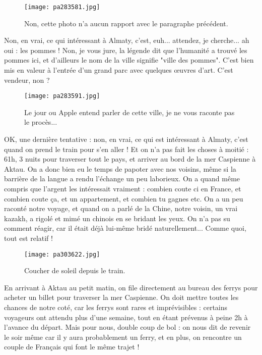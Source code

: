 \documentclass{book}
\begin{document}
\begin{figure}[h]
\centering
\texttt{[image: pa283581.jpg]}
\caption*{Non, cette photo n'a aucun rapport avec le paragraphe précédent.}
\end{figure}

Non, en vrai, ce qui intéressant à Almaty, c'est, euh... attendez, je cherche... ah oui : les pommes ! Non, je vous jure, la légende dit que l'humanité a trouvé les pommes ici, et d'ailleurs le nom de la ville signifie "ville des pommes". C'est bien mis en valeur à l'entrée d'un grand parc avec quelques œuvres d'art. C'est vendeur, non ?


\begin{figure}[h]
\centering
\texttt{[image: pa283591.jpg]}
\caption*{Le jour ou Apple entend parler de cette ville, je ne vous raconte pas le procès...}
\end{figure}

OK, une dernière tentative : non, en vrai, ce qui est intéressant à Almaty, c'est quand on prend le train pour s'en aller ! Et on n'a pas fait les choses à moitié : 61h, 3 nuits pour traverser tout le pays, et arriver au bord de la mer Caspienne à Aktau. On a donc bien eu le temps de papoter avec nos voisins, même si la barrière de la langue a rendu l'échange un peu laborieux. On a quand même compris que l'argent les intéressait vraiment : combien coute ci en France, et combien coute ça, et un appartement, et combien tu gagnes etc. On a un peu raconté notre voyage, et quand on a parlé de la Chine, notre voisin, un vrai kazakh, a rigolé et mimé un chinois en se bridant les yeux. On n'a pas su comment réagir, car il était déjà lui-même bridé naturellement... Comme quoi, tout est relatif !


\begin{figure}[h]
\centering
\texttt{[image: pa303622.jpg]}
\caption*{Coucher de soleil depuis le train.}
\end{figure}

En arrivant à Aktau au petit matin, on file directement au bureau des ferrys pour acheter un billet pour traverser la mer Caspienne. On doit mettre toutes les chances de notre coté, car les ferrys sont rares et imprévisibles : certains voyageurs ont attendu plus d'une semaine, tout en étant prévenus à peine 2h à l'avance du départ. Mais pour nous, double coup de bol : on nous dit de revenir le soir même car il y aura probablement un ferry, et en plus, on rencontre un couple de Français qui font le même trajet !
\end{document}
